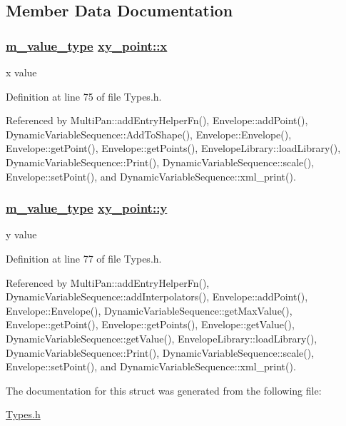 \subsection{Member Data Documentation}
\hypertarget{structxy__point_o0}{
\subsubsection[x]{\setlength{\rightskip}{0pt plus 5cm}\hyperlink{Types_8h_a3}{m\_\-value\_\-type} \hyperlink{structxy__point_o0}{xy\_\-point::x}}}
\label{structxy__point_o0}


x value 



Definition at line 75 of file Types.h.

Referenced by Multi\-Pan::add\-Entry\-Helper\-Fn(), Envelope::add\-Point(), Dynamic\-Variable\-Sequence::Add\-To\-Shape(), Envelope::Envelope(), Envelope::get\-Point(), Envelope::get\-Points(), Envelope\-Library::load\-Library(), Dynamic\-Variable\-Sequence::Print(), Dynamic\-Variable\-Sequence::scale(), Envelope::set\-Point(), and Dynamic\-Variable\-Sequence::xml\_\-print().\hypertarget{structxy__point_o1}{
\subsubsection[y]{\setlength{\rightskip}{0pt plus 5cm}\hyperlink{Types_8h_a3}{m\_\-value\_\-type} \hyperlink{structxy__point_o1}{xy\_\-point::y}}}
\label{structxy__point_o1}


y value 



Definition at line 77 of file Types.h.

Referenced by Multi\-Pan::add\-Entry\-Helper\-Fn(), Dynamic\-Variable\-Sequence::add\-Interpolators(), Envelope::add\-Point(), Envelope::Envelope(), Dynamic\-Variable\-Sequence::get\-Max\-Value(), Envelope::get\-Point(), Envelope::get\-Points(), Envelope::get\-Value(), Dynamic\-Variable\-Sequence::get\-Value(), Envelope\-Library::load\-Library(), Dynamic\-Variable\-Sequence::Print(), Dynamic\-Variable\-Sequence::scale(), Envelope::set\-Point(), and Dynamic\-Variable\-Sequence::xml\_\-print().

The documentation for this struct was generated from the following file:\begin{CompactItemize}
\item 
\hyperlink{Types_8h}{Types.h}\end{CompactItemize}
